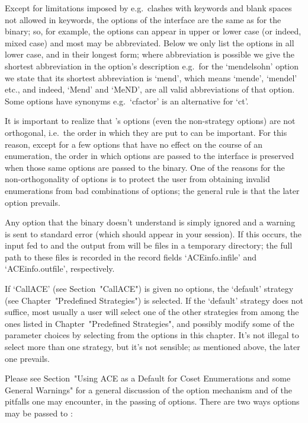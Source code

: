 Except for limitations imposed  by {\GAP}  e.g.\ clashes  with {\GAP}
keywords and blank spaces not allowed in keywords, the options of the
{\ACE} interface are the same as for the binary; so, for example, the
options can appear in upper or lower case (or indeed, mixed case) and
most may be abbreviated. Below we only list the options in all  lower
case, and in their longest form;  where  abbreviation is possible  we
give the shortest abbreviation in the option's description   e.g.~for
the `mendelsohn' option we state that  its  shortest  abbreviation is
`mend', which means `mende', `mendel' etc., and  indeed,  `Mend'  and
`MeND', are all valid abbreviations of that option. Some options have
synonyms e.g.~`cfactor' is an alternative for `ct'.

It is important to realize that {\ACE}'s options (even the non-strategy 
options) are not orthogonal, i.e.\ the order in which they are put to
{\ACE} can be important.  For this reason,  except for a  few options
that have no effect on the course of an  enumeration,  the  order  in
which  options  are passed to the {\ACE} interface is preserved  when 
those same options are passed to the {\ACE} binary. One of the reasons
for  the  non-orthogonality  of  options  is to protect the user from
obtaining invalid enumerations from bad combinations of options;  the
general rule is that the later option prevails.

Any  option  that the {\ACE} binary doesn't  understand  is    simply
ignored  and a warning is sent to standard error (which should appear
in your {\GAP} session). If this occurs, the input fed to  {\ACE} and
the output from {\ACE} will be files  in a  temporary directory;  the
full   path   to  these   files   is  recorded  in  the record fields
`ACEinfo.infile' and `ACEinfo.outfile', respectively.

If `CallACE' (see Section~"CallACE") is given no options, the `default'
strategy (see Chapter~"Predefined Strategies")  is  selected.  If  the
`default' strategy does not suffice, most usually a user will   select
one   of   the   other   strategies   from   among  the ones listed in 
Chapter~"Predefined Strategies", and   possibly   modify   some of the 
parameter choices by selecting from the options in this chapter.  It's
not illegal to select more than one strategy,  but  it's not sensible;
as mentioned above, the later one prevails.

Please  see Section~"Using ACE as a Default for Coset Enumerations and 
some General Warnings" for a general discussion of the option mechanism
and of the pitfalls one  may encounter, in the passing of options.
There are two ways options may be passed to {\ACE}:

